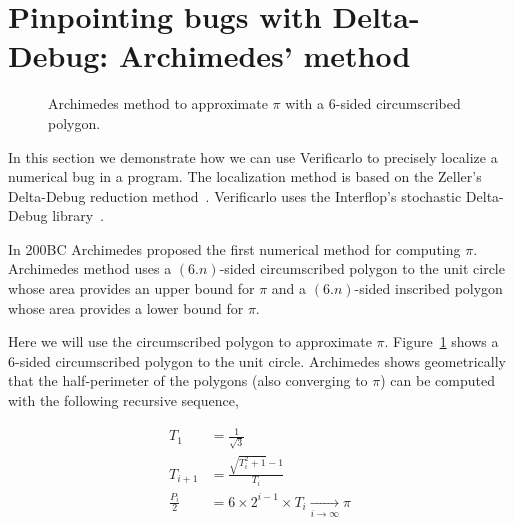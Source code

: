 \section{Pinpointing bugs with Delta-Debug: Archimedes' method}

\begin{figure}[h]
  \centering
  \caption{Archimedes method to approximate $\pi$ with a 6-sided circumscribed polygon.
    \label{fig:archimedes}
  }
\end{figure}

In this section we demonstrate how we can use Verificarlo to precisely localize a numerical bug in a program. The localization method is based on the Zeller's Delta-Debug reduction method~\cite{zeller2001automated}. Verificarlo uses the Interflop's stochastic Delta-Debug library~\cite{verrou,interflop}.

In 200BC Archimedes proposed the first numerical method for computing $\pi$.
Archimedes method uses a $(6.n)$-sided circumscribed polygon to the unit circle
whose area provides an upper bound for $\pi$ and a $(6.n)$-sided inscribed polygon
whose area provides a lower bound for $\pi$.

Here we will use the circumscribed polygon to approximate $\pi$.
Figure~\ref{fig:archimedes} shows a 6-sided circumscribed polygon to the unit
circle. Archimedes shows geometrically that the half-perimeter of the polygons (also converging to $\pi$) can be computed with the following recursive sequence,

\begin{align*}
  T_1 &= \frac{1}{\sqrt{3}} \\
  T_{i+1} &= \frac{\sqrt{T_i^2+1} - 1}{T_i} \\
  \frac{P_{i}}{2} &= 6 \times 2^{i-1} \times T_{i} \xrightarrow[i \to \infty]{} \pi
\end{align*}

